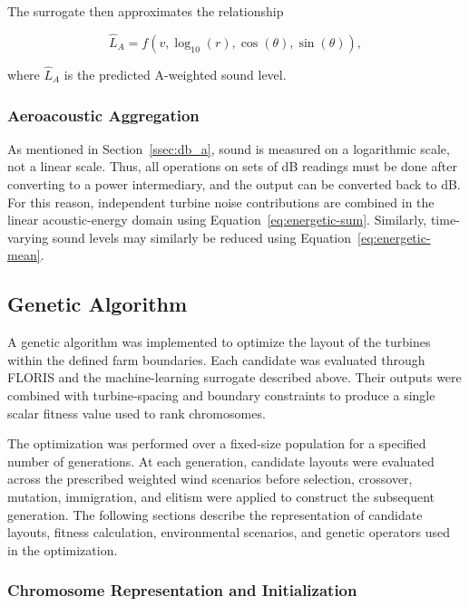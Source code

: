 \documentclass[11pt]{article}
\begin{document}
The surrogate then approximates the relationship

\begin{equation}
    \hat{L}_{A}
    =
    f\left(
        v,
        \log_{10}(r),
        \cos(\theta),
        \sin(\theta)
    \right),
\end{equation}

where $\hat{L}_{A}$ is the predicted A-weighted sound level.

\subsubsection{Aeroacoustic Aggregation}
\label{sssec:aa-aggregation}

As mentioned in Section~\ref{ssec:db_a}, sound is measured on a logarithmic scale, not a linear scale. Thus, all operations on sets of dB readings must be done after converting to a power intermediary, and the output can be converted back to dB. For this reason, independent turbine noise contributions are combined in the linear acoustic-energy domain using Equation~\ref{eq:energetic-sum}. Similarly, time-varying sound levels may similarly be reduced using Equation~\ref{eq:energetic-mean}.

\subsection{Genetic Algorithm}

A genetic algorithm was implemented to optimize the layout of the turbines within the defined farm boundaries. Each candidate was evaluated through FLORIS and the machine-learning surrogate described above. Their outputs were combined with turbine-spacing and boundary constraints to produce a single scalar fitness value used to rank chromosomes.

The optimization was performed over a fixed-size population for a specified number of generations. At each generation, candidate layouts were evaluated across the prescribed weighted wind scenarios before selection, crossover, mutation, immigration, and elitism were applied to construct the subsequent generation. The following sections describe the representation of candidate layouts, fitness calculation, environmental scenarios, and genetic operators used in the optimization.

\subsubsection{Chromosome Representation and Initialization}
\end{document}
